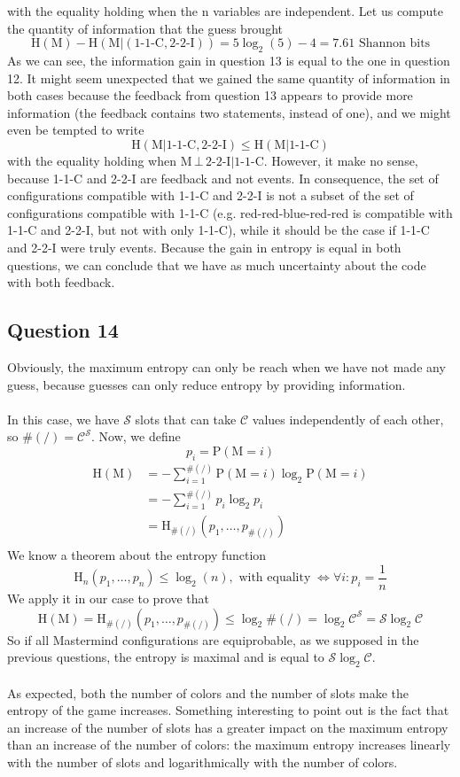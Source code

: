 \documentclass{article}
\begin{document}
with the equality holding when the n variables are independent. Let us compute the quantity of information that the guess brought
$$
\mbox{H}(\mbox{M}) - \mbox{H}(\mbox{M}|(\mbox{1-1-C},\mbox{2-2-I})) = 5\log_2(5) - 4 = 7.61 \mbox{ Shannon bits}
$$
As we can see, the information gain in question 13 is equal to the one in question 12. It might seem unexpected that we gained the same quantity of information in both cases because the feedback from question 13 appears to provide more information (the feedback contains two statements, instead of one), and we might even be tempted to write
$$
\mbox{H}(\mbox{M}|\mbox{1-1-C},\mbox{2-2-I}) \leq \mbox{H}(\mbox{M}|\mbox{1-1-C})
$$
with the equality holding when $\mbox{M} \,\bot \,\mbox{2-2-I} |\mbox{1-1-C}$. However, it make no sense, because 1-1-C and 2-2-I are feedback and not events. In consequence, the set of configurations compatible with 1-1-C and 2-2-I is not a subset of the set of configurations compatible with 1-1-C (e.g. red-red-blue-red-red is compatible with 1-1-C and 2-2-I, but not with only 1-1-C), while it should be the case if 1-1-C and 2-2-I were truly events. Because the gain in entropy is equal in both questions, we can conclude that we have as much uncertainty about the code with both feedback.
\subsection*{Question 14}
Obviously, the maximum entropy can only be reach when we have not made any guess, because guesses can only reduce entropy by providing information.
\\\\
In this case, we have $\mathcal{S}$ slots that can take $\mathcal{C}$ values independently of each other, so $\#(/) = \mathcal{C}^\mathcal{S}$. Now, we define
$$
p_i=\mbox{P}(\mbox{M}=i)
$$
\begin{align*}
    \mbox{H}(\mbox{M}) &= -\sum_{i=1}^{\#(/)} \mbox{P}(\mbox{M}=i)\log_2\mbox{P}(\mbox{M}=i)\\
    &=-\sum_{i=1}^{\#(/)} p_i\log_2p_i\\
    &=\mbox{H}_{\#(/)}\left(p_1,\dots,p_{\#(/)}\right)\\
\end{align*}
We know a theorem about the entropy function
$$
\mbox{H}_n(p_1,\dots,p_n) \leq \log_2(n), \mbox{ with equality}\; \Leftrightarrow \forall i:p_i = \frac{1}{n}
$$
We apply it in our case to prove that
$$
    \mbox{H}(\mbox{M}) =\mbox{H}_{\#(/)}\left(p_1,\dots,p_{\#(/)}\right) \leq \log_2\#(/) = \log_2\mathcal{C}^\mathcal{S} = \mathcal{S}\log_2\mathcal{C}
$$
So if all Mastermind configurations are equiprobable, as we supposed in the previous questions, the entropy is maximal and is equal to $\mathcal{S}\log_2\mathcal{C}$.
\\\\
As expected, both the number of colors and the number of slots make the entropy of the game increases. Something interesting to point out is the fact that an increase of the number of slots has a greater impact on the maximum entropy than an increase of the number of colors: the maximum entropy increases linearly with the number of slots and logarithmically with the number of colors.
\end{document}
